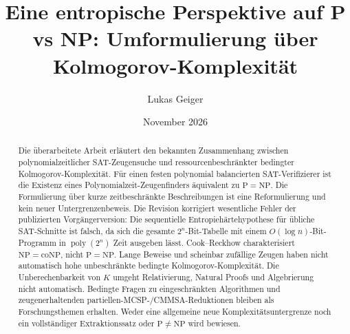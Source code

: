 \documentclass[aps,prd,twocolumn,superscriptaddress,nofootinbib]{revtex4-2}
\theoremstyle{definition}
\theoremstyle{remark}
\DeclareMathOperator{\poly}{poly}
\newcommand{\NP}{\mathrm{NP}}
\newcommand{\PP}{\mathrm{P}}
\newcommand{\coNP}{\mathrm{coNP}}
\begin{document}

\title{Eine entropische Perspektive auf P vs NP: Umformulierung über Kolmogorov-Komplexität}

\author{Lukas Geiger}

\date{November 2026}

\begin{abstract}
Die überarbeitete Arbeit erläutert den bekannten Zusammenhang
zwischen polynomialzeitlicher SAT-Zeugensuche und
ressourcenbeschränkter bedingter Kolmogorov-Komplexität. Für einen
festen polynomial balancierten SAT-Verifizierer ist die Existenz
eines Polynomialzeit-Zeugenfinders äquivalent zu $\PP=\NP$.
Die Formulierung über kurze zeitbeschränkte Beschreibungen ist
eine Reformulierung und kein neuer Untergrenzenbeweis.
Die Revision korrigiert wesentliche Fehler der publizierten
Vorgängerversion: Die sequentielle Entropiehärtehypothese für
übliche SAT-Schnitte ist falsch, da sich die gesamte $2^n$-Bit-Tabelle
mit einem $O(\log n)$-Bit-Programm in $\poly(2^n)$ Zeit ausgeben lässt.
Cook--Reckhow charakterisiert $\NP=\coNP$, nicht $\PP=\NP$.
Lange Beweise und scheinbar zufällige Zeugen haben nicht
automatisch hohe unbeschränkte bedingte Kolmogorov-Komplexität.
Die Unberechenbarkeit von $K$ umgeht Relativierung,
Natural Proofs und Algebrierung nicht automatisch.
Bedingte Fragen zu eingeschränkten Algorithmen und
zeugenerhaltenden partiellen-MCSP-/CMMSA-Reduktionen bleiben
als Forschungsthemen erhalten. Weder eine allgemeine neue
Komplexitätsuntergrenze noch ein vollständiger Extraktionssatz
oder $\PP\ne\NP$ wird bewiesen.
\end{abstract}




\maketitle
\clearpage
\tableofcontents
\clearpage
\end{document}
